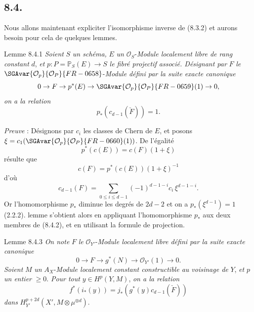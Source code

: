 \subsection*{8.4.}

Nous allons maintenant expliciter l'isomorphisme inverse de (8.3.2) et aurons besoin pour cela de quelques lemmes.

\begin{statement}{Lemme 8.4.1}
\emph{Soient} $S$ \emph{un schéma,} $E$ \emph{un} $\mathcal{O}_S$-\emph{Module localement libre de rang constant} $d$, \emph{et} $p:P=\mathbb{P}_S(E)\to S$ \emph{le fibré projectif associé. Désignant par} $F$ \emph{le} $\SGAvar{\mathcal{O}_p}{\mathcal{O}_P}{FR-0658}$-\emph{Module défini par la suite exacte canonique}
\[
0\to F\to p^*(E)\to\SGAvar{\mathcal{O}_p}{\mathcal{O}_P}{FR-0659}(1)\to0,
\]
\emph{on a la relation}
\[
p_*(c_{d-1}(\check F))=1.
\]
\end{statement}

\emph{Preuve} : Désignons par $c_i$ les classes de Chern de $E$, et posons $\xi=c_1(\SGAvar{\mathcal{O}_p}{\mathcal{O}_P}{FR-0660}(1))$. De l'égalité
\[
p^*(c(E))=c(F)(1+\xi)
\]
résulte que
\[
c(F)=p^*(c(E))(1+\xi)^{-1}
\]
d'où
\[
c_{d-1}(F)=\sum_{0\le i\le d-1}(-1)^{d-1-i}c_i\,\xi^{d-1-i}.
\tag{8.4.2}
\]
Or l'homomorphisme $p_*$ diminue les degrés de $2d-2$ et on a $p_*(\xi^{d-1})=1$ (2.2.2).  lemme s'obtient alors en appliquant l'homomorphisme $p_*$ aux deux membres de (8.4.2), et en utilisant la formule de projection.

\begin{statement}{Lemme 8.4.3}
\emph{On note} $F$ \emph{le} $\mathcal{O}_{Y'}$-\emph{Module localement libre défini par la suite exacte canonique}
\[
0\to F\to g^*(N)\to\mathcal{O}_{Y'}(1)\to0.
\]
\emph{Soient} $M$ \emph{un} $A_X$-\emph{Module localement constant constructible au voisinage de} $Y$, \emph{et} $p$ \emph{un entier} $\ge0$. \emph{Pour tout} $y\in H^p(Y,M)$, \emph{on a la relation}
\[
f^*(i_*(y))=j_*(g^*(y)c_{d-1}(\check F))
\]
\emph{dans} $H_{Y'}^{p+2d}(X',M\otimes\mu^{\otimes d})$.
\end{statement}

